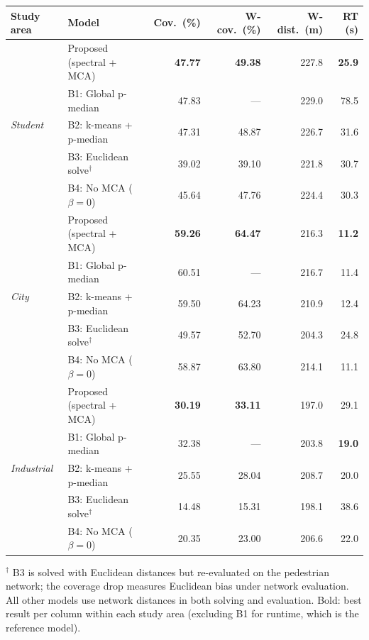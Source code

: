 \begin{tabular}{llrrrr}
\toprule
\textbf{Study area} & \textbf{Model}
  & \textbf{Cov.\ (\%)}
  & \textbf{W-cov.\ (\%)}
  & \textbf{W-dist.\ (m)}
  & \textbf{RT (s)} \\
\midrule
\multirow{5}{*}{\textit{Student}}
  & Proposed (spectral + MCA)  & \textbf{47.77} & \textbf{49.38} & 227.8 & \textbf{25.9} \\
  & B1: Global p-median        & 47.83 & —     & 229.0 & 78.5 \\
  & B2: k-means + p-median     & 47.31 & 48.87 & 226.7 & 31.6 \\
  & B3: Euclidean solve$^\dagger$ & 39.02 & 39.10 & 221.8 & 30.7 \\
  & B4: No MCA ($\beta=0$)     & 45.64 & 47.76 & 224.4 & 30.3 \\
\midrule
\multirow{5}{*}{\textit{City}}
  & Proposed (spectral + MCA)  & \textbf{59.26} & \textbf{64.47} & 216.3 & \textbf{11.2} \\
  & B1: Global p-median        & 60.51 & —     & 216.7 & 11.4 \\
  & B2: k-means + p-median     & 59.50 & 64.23 & 210.9 & 12.4 \\
  & B3: Euclidean solve$^\dagger$ & 49.57 & 52.70 & 204.3 & 24.8 \\
  & B4: No MCA ($\beta=0$)     & 58.87 & 63.80 & 214.1 & 11.1 \\
\midrule
\multirow{5}{*}{\textit{Industrial}}
  & Proposed (spectral + MCA)  & \textbf{30.19} & \textbf{33.11} & 197.0 & 29.1 \\
  & B1: Global p-median        & 32.38 & —     & 203.8 & \textbf{19.0} \\
  & B2: k-means + p-median     & 25.55 & 28.04 & 208.7 & 20.0 \\
  & B3: Euclidean solve$^\dagger$ & 14.48 & 15.31 & 198.1 & 38.6 \\
  & B4: No MCA ($\beta=0$)     & 20.35 & 23.00 & 206.6 & 22.0 \\
\bottomrule
\end{tabular}

\smallskip\noindent
{\footnotesize $^\dagger$ B3 is solved with Euclidean distances but
  re-evaluated on the pedestrian network; the coverage drop measures
  Euclidean bias under network evaluation. All other models use
  network distances in both solving and evaluation.}
\smallskip\noindent
{\footnotesize Bold: best result per column within each study area
  (excluding B1 for runtime, which is the reference model).}
